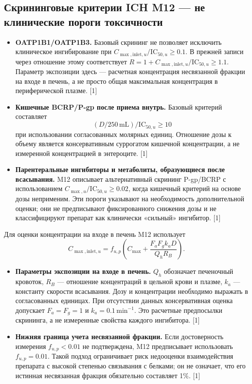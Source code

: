 \documentclass[11pt]{article}
\begin{document}
\subsection{Скрининговые критерии ICH M12 --- не клинические пороги токсичности}

\begin{itemize}
\item \textbf{OATP1B1/OATP1B3.} Базовый скрининг не позволяет исключить клиническое ингибирование при \(C_{\max,\mathrm{inlet},u}/\mathrm{IC}_{50,u}\geq0.1\). В прежней записи через отношение этому соответствует \(R=1+C_{\max,\mathrm{inlet},u}/\mathrm{IC}_{50,u}\geq1.1\). Параметр экспозиции здесь --- расчетная концентрация несвязанной фракции на входе в печень, а не просто общая максимальная концентрация в периферической плазме. [1]
\item \textbf{Кишечные BCRP/P-gp после приема внутрь.} Базовый критерий составляет
\[
(D/250\,\mathrm{mL})/\mathrm{IC}_{50,u}\geq10
\]
при использовании согласованных молярных единиц. Отношение дозы к объему является консервативным суррогатом кишечной концентрации, а не измеренной концентрацией в энтероците. [1]
\item \textbf{Парентеральные ингибиторы и метаболиты, образующиеся после всасывания.} M12 описывает альтернативный скрининг P-gp/BCRP с использованием \(C_{\max,u}/\mathrm{IC}_{50,u}\geq0.02\), когда кишечный критерий на основе дозы неприменим. Эти пороги указывают на необходимость дополнительной оценки; они не предписывают фиксированного снижения дозы и не классифицируют препарат как клинически «сильный» ингибитор. [1]
\end{itemize}

Для оценки концентрации на входе в печень M12 использует
\[
C_{\max,\mathrm{inlet},u}
=f_{u,p}\left(C_{\max}+\frac{F_a F_g k_a D}{Q_h R_B}\right).
\]
\begin{itemize}
\item \textbf{Параметры экспозиции на входе в печень.} \(Q_h\) обозначает печеночный кровоток, \(R_B\) --- отношение концентраций в цельной крови и плазме, \(k_a\) --- константу скорости всасывания. Дозу и концентрации необходимо выражать в согласованных единицах. При отсутствии данных консервативная оценка допускает \(F_a=F_g=1\) и \(k_a=0.1\,\mathrm{min}^{-1}\). Это расчетные предпосылки скрининга, а не измеренные свойства каждого ингибитора. [1]
\item \textbf{Нижняя граница учета несвязанной фракции.} Если достоверность измерения \(f_{u,p}<0.01\) не подтверждена, M12 предписывает использовать \(f_{u,p}=0.01\). Такой подход ограничивает риск недооценки взаимодействия препарата с высокой степенью связывания с белками; он не означает, что его истинная несвязанная фракция обязательно составляет 1\%. [1]
\end{itemize}
\end{document}
